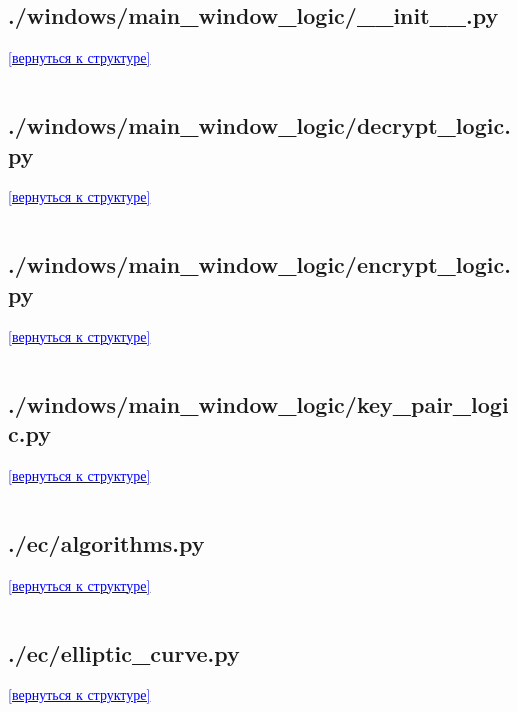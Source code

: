 \label{sec:windows_logic_init}
\subsection*{./windows/main\_window\_logic/\_\_init\_\_.py}
\noindent\hyperref[sec:appendix]{\textcolor{blue}{[вернуться к структуре]}}
\inputminted{python}{../windows/main_window_logic/__init__.py}

\label{sec:windows_logic_decrypt}
\subsection*{./windows/main\_window\_logic/decrypt\_logic.py}
\noindent\hyperref[sec:appendix]{\textcolor{blue}{[вернуться к структуре]}}
\inputminted{python}{../windows/main_window_logic/decrypt_logic.py}

\label{sec:windows_logic_encrypt}
\subsection*{./windows/main\_window\_logic/encrypt\_logic.py}
\noindent\hyperref[sec:appendix]{\textcolor{blue}{[вернуться к структуре]}}
\inputminted{python}{../windows/main_window_logic/encrypt_logic.py}

\label{sec:windows_logic_key_pair}
\subsection*{./windows/main\_window\_logic/key\_pair\_logic.py}
\noindent\hyperref[sec:appendix]{\textcolor{blue}{[вернуться к структуре]}}
\inputminted{python}{../windows/main_window_logic/key_pair_logic.py}

\label{sec:ec_algorithms}
\subsection*{./ec/algorithms.py}
\noindent\hyperref[sec:appendix]{\textcolor{blue}{[вернуться к структуре]}}
\inputminted{python}{../ec/algorithms.py}

\label{sec:ec_elliptic_curve}
\subsection*{./ec/elliptic\_curve.py}
\noindent\hyperref[sec:appendix]{\textcolor{blue}{[вернуться к структуре]}}
\inputminted{python}{../ec/elliptic_curve.py}

